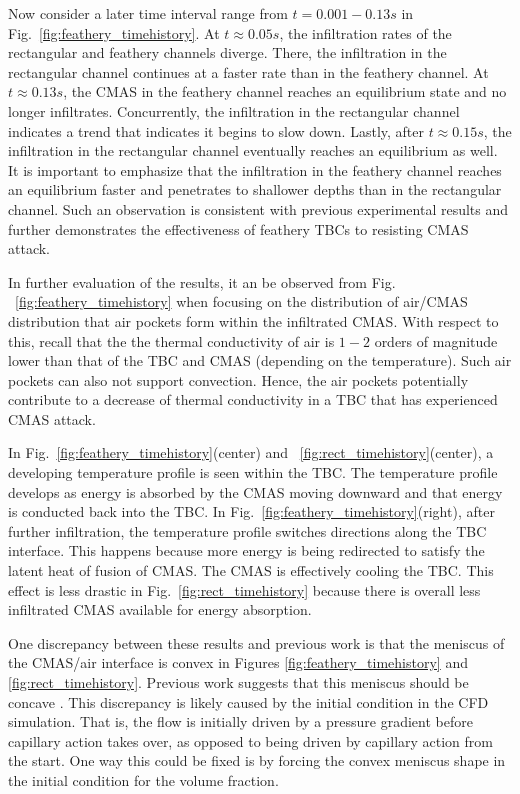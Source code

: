 \documentclass[%
 aip,
 amsmath,amssymb,
 reprint,%
]{revtex4-1}
\begin{document}
Now consider a later time interval range from $t=0.001 - 0.13 s$ in Fig.~\ref{fig:feathery_timehistory}.
At $t \approx 0.05s$, the infiltration rates of the rectangular and feathery channels diverge.
There, the infiltration in the rectangular channel continues at a faster rate than in the feathery channel.
At $t \approx 0.13 s$, the CMAS in the feathery channel reaches an equilibrium state and no longer infiltrates. Concurrently, the infiltration in the rectangular channel indicates a trend that indicates it begins to slow down.
Lastly, after $t \approx 0.15 s$, the infiltration in the rectangular channel eventually reaches an equilibrium as well.
It is important to emphasize that the infiltration in the feathery channel reaches an equilibrium faster and penetrates to shallower depths than in the rectangular channel.
Such an observation is consistent with previous experimental results \cite{Naraparaju2017} and further demonstrates the effectiveness of feathery TBCs to resisting CMAS attack.

In further evaluation of the results, it an be observed from Fig. ~\ref{fig:feathery_timehistory} when focusing on the distribution of air/CMAS distribution that air pockets form within the infiltrated CMAS.
With respect to this, recall that the the thermal conductivity of air is $1-2$ orders of magnitude lower than that of the TBC and CMAS (depending on the temperature). Such air pockets can also not support convection. Hence, the air pockets potentially contribute to a decrease of thermal conductivity in a TBC that has experienced CMAS attack.

In Fig.~\ref{fig:feathery_timehistory}(center) and ~\ref{fig:rect_timehistory}(center), a developing temperature profile is seen within the TBC. The temperature profile develops as energy is absorbed by the CMAS moving downward and that energy is conducted back into the TBC. 
In Fig.~\ref{fig:feathery_timehistory}(right), after further infiltration, the temperature profile switches directions along the TBC interface.
This happens because more energy is being redirected to satisfy the latent heat of fusion of CMAS. The CMAS is effectively cooling the TBC.
This effect is less drastic in Fig.~\ref{fig:rect_timehistory} because there is overall less infiltrated CMAS available for energy absorption.

One discrepancy between these results and previous work is that the meniscus of the CMAS/air interface is convex in Figures \ref{fig:feathery_timehistory} and \ref{fig:rect_timehistory}. Previous work suggests that this meniscus should be concave \cite{Naraparaju2019}. This discrepancy is likely caused by the initial condition in the CFD simulation. That is, the flow is initially driven by a pressure gradient before capillary action takes over, as opposed to being driven by capillary action from the start. One way this could be fixed is by forcing the convex meniscus shape in the initial condition for the volume fraction.
\end{document}
